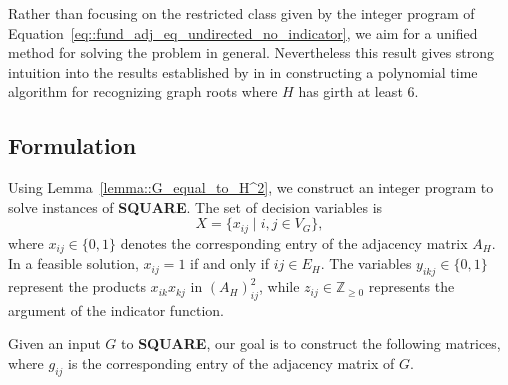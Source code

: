\documentclass[11pt]{report}
\begin{document}
Rather than focusing on the restricted class given by the integer program of Equation~\eqref{eq::fund_adj_eq_undirected_no_indicator}, we aim for a unified method for solving the problem in general. Nevertheless this result gives strong intuition into the results established by \citeauthor{farzad_2009_roots} in \cite{farzad_2009_roots} in constructing a polynomial time algorithm for recognizing graph roots where $H$ has girth at least $6$. 

\subsection{Formulation} \label{subsec::integer_program_formulation}

Using Lemma~\eqref{lemma::G_equal_to_H^2}, we construct an integer program to solve instances of \textbf{SQUARE}. The set of decision variables is
\[
X=\{x_{ij}\mid i,j\in V_G\},
\]
where $x_{ij}\in\{0,1\}$ denotes the corresponding entry of the adjacency matrix $A_H$. In a feasible solution, $x_{ij}=1$ if and only if $ij \in E_H$. The variables $y_{ikj}\in\{0,1\}$ represent the products $x_{ik}x_{kj}$ in $(A_H)^2_{ij}$, while $z_{ij}\in\mathbb{Z}_{\geq0}$ represents the argument of the indicator function.

Given an input $G$ to \textbf{SQUARE}, our goal is to construct the following matrices, where $g_{ij}$ is the corresponding entry of the adjacency matrix of $G$.
\end{document}

